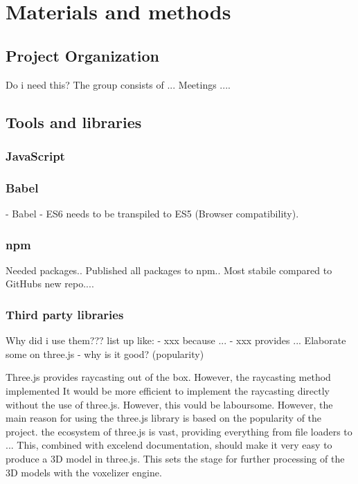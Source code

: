 \chapter[Method]{Materials and methods}



\section{Project Organization}
Do i need this?
The group consists of ...
Meetings ....


\section{Tools and libraries}
\subsection{JavaScript}

\subsection{Babel}
- Babel - ES6 needs to be transpiled to ES5 (Browser compatibility).
\subsection{npm}
Needed packages.. Published all packages to npm.. Most stabile compared to GitHubs new repo....

\subsection{Third party libraries}
Why did i use them???
list up like:
- xxx because ...
- xxx provides ...
Elaborate some on three.js - why is it good? (popularity)

Three.js provides raycasting out  of the box. However, the raycasting method implemented It would be more efficient to implement the raycasting directly without the use of three.js. However, this vould be laboursome. However, the main reason for using the three.js library is based on the popularity of the project. the ecosystem of three.js is vast, providing everything from file loaders to ... This, combined with excelend documentation, should make it very easy to produce a 3D model in three.js. This sets the stage for further processing of the 3D models with the voxelizer engine.


